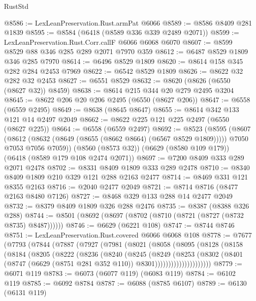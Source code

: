 \begin{lexlean}{RustStd}
\begin{coremodule}
@8586 := LexLeanPreservation.Rust.armPat @6066
@8589 := @8586 @8409 @281 @1839
@8595 := @8584 (@6418 (@8589 @336 @339 @2489 @2071))
@8599 := LexLeanPreservation.Rust.Corr.callF @6066 @6068 @6070
@8607 := @8599 @8529 @88 @346 @285 @289 @2071 @7970 @359
@8612 := @6487 @8529 @1809 @346 @285 @7970
@8614 := @6496 @8529 @1809
@8620 := @8614 @158 @345 @282 @284 @2453 @7969
@8622 := @6542 @8529 @1809
@8626 := @8622 @32 @282 @32 @2453
@8627 := @6551 @8529
@8632 := @8620 (@8626 (@6550 (@8627 @32)) @8459)
@8638 := @8614 @215 @344 @20 @279 @2495 @3204
@8645 := @8622 @206 @20 @206 @2495 (@6550 (@8627 @206))
@8647 := @6558 (@6559 @2495)
@8649 := @8638 (@8645 @8647)
@8655 := @8614 @342 @133 @121 @14 @2497 @2049
@8662 := @8622 @225 @121 @225 @2497 (@6550 (@8627 @225))
@8664 := @6558 (@6559 @2497)
@8692 := @8523
    (@8595
      (@8607
        (@8612 (@8632 (@8649 (@8655 (@8662 @8664) (@6567 @8529 @1809)))))
        @7050
        @7053
        @7056
        @7059))
    (@8560 (@8573 @32))
    (@6629 (@8580 @109 @179))
    (@6418 (@8589 @179 @108 @2474 @2071))
@8697 := @7200 @8409 @333 @289 @2071 @2478
@8702 := @8331 @8409 @1809 @333 @289 @2478
@8710 := @8340 @8409 @1809 @210 @329 @121 @288 @2163 @2477
@8714 := @8469 @331 @121 @8355 @2163
@8716 := @2040 @2477 @2049
@8721 := @8714 @8716 (@8477 @2163 @8480 @7126)
@8727 := @8468 @329 @133 @288 @14 @2477 @2049
@8732 := @8379 @8409 @1809 @326 @288 @2476
@8735 := @8387 (@8388 @326 @288)
@8744 := @8501 (@8692 (@8697 (@8702 (@8710 (@8721 (@8727 (@8732 @8735) @8487))))))
@8746 := @6629 (@6221 @108)
@8747 := @8744 @8746
@8751 := LexLeanPreservation.Rust.covered @6066 @6068 @108
@8778 := @7677
    (@7793
      (@7844
        (@7887
          (@7927
            (@7981
              (@8021
                (@8058
                  (@8095
                    (@8128
                      (@8158
                        (@8184
                          (@8205
                            (@8222
                              (@8236
                                (@8240
                                  (@8245
                                    (@8249
                                      (@8253
                                        (@8302
                                          (@8401
                                            (@8747
                                              (@6629 (@8751 @281 @352 @110))
                                              @8301)))))))))))))))))))))
@8779 := @6071 @119
@8783 := @6073 (@6077 @119) (@6083 @119)
@8784 := @6102 @119
@8785 := @6092 @8784
@8787 := @6088 (@8785 @6107)
@8789 := @6130 (@6131 @119)

\end{coremodule}
\end{lexlean}
